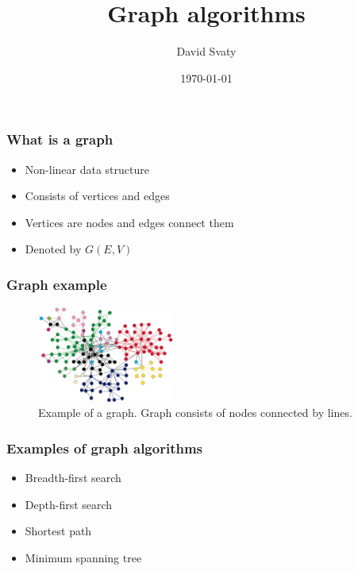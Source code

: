 \documentclass[pdf,fyma2]{beamer}
\title{Graph algorithms}
\author{David Svaty}
\institute{ Faculty of Information Technology, BUT }
\date{\today}
\begin{document}
    
\frame{\titlepage}

\begin{frame}
    \frametitle{What is a graph}
    \begin{itemize}
        \item Non-linear data structure
        \item Consists of vertices and edges
        \item Vertices are nodes and edges connect them
        \item Denoted by $G(E,V)$ 
    \end{itemize}
\end{frame}

\begin{frame}
    \frametitle{Graph example}
    \begin{figure}
        \includegraphics[width=170px]{img/graph-algorithms1.png}
        \caption{Example of a graph. Graph consists of nodes connected by lines.}
    \end{figure}
\end{frame}

\begin{frame}
    \frametitle{Examples of graph algorithms}
    \begin{itemize}
        \item Breadth-first search
        \item Depth-first search
        \item Shortest path
        \item Minimum spanning tree 
    \end{itemize}
\end{frame}
\end{document}

